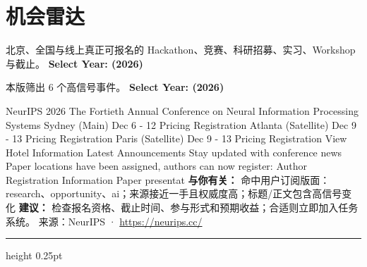 \documentclass[10.5pt]{ctexart}
\begin{document}
\section*{机会雷达}
{\color{ormuted} 北京、全国与线上真正可报名的 Hackathon、竞赛、科研招募、实习、Workshop 与截止。}
\vspace{2mm}
{\LARGE\bfseries Select Year: (2026)}\par
\vspace{1mm}
{\color{ormuted} 本版筛出 6 个高信号事件。}
\vspace{3mm}
{\Large\bfseries Select Year: (2026)}\par
NeurIPS 2026 The Fortieth Annual Conference on Neural Information Processing Systems Sydney (Main) Dec 6 - 12 Pricing Registration Atlanta (Satellite) Dec 9 - 13 Pricing Registration Paris (Satellite) Dec 9 - 13 Pricing Registration View Hotel Information Latest Announcements Stay updated with conference news Paper locations have been assigned, authors can now register: Author Registration Information Paper presentat
\textbf{与你有关：} 命中用户订阅版面：research、opportunity、ai；来源接近一手且权威度高；标题/正文包含高信号变化
\textbf{建议：} 检查报名资格、截止时间、参与形式和预期收益；合适则立即加入任务系统。
{\footnotesize\color{ormuted} 来源：NeurIPS · \url{https://neurips.cc/}}
\vspace{4mm}
\hrule height 0.25pt
\vspace{3mm}
\end{document}
